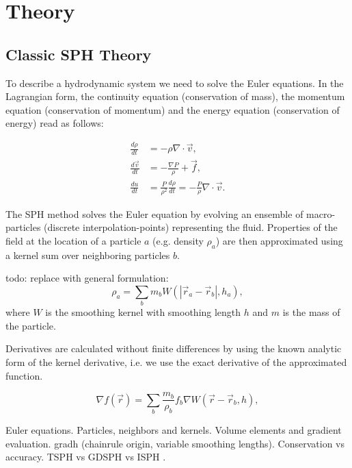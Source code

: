 \section{Theory}

\subsection{Classic SPH Theory}
To describe a hydrodynamic system we need to solve the Euler equations. In the Lagrangian form, the continuity equation (conservation of mass), the momentum equation (conservation of momentum) and the energy equation (conservation of energy) read as follows: 

\begin{align}
\frac{d\rho}{dt} &= -\rho \nabla \cdot \vec{v}, \\
\frac{d\vec{v}}{dt} &= -\frac{\nabla P}{\rho} + \vec{f}, \\
\frac{du}{dt} &= \frac{P}{\rho^2}\frac{d\rho}{dt} = -\frac{P}{\rho}\nabla \cdot \vec{v}.
\end{align}

The SPH method solves the Euler equation by evolving an ensemble of macro-particles (discrete interpolation-points) representing the fluid. Properties of the field at the location of a particle $a$ (e.g. density $\rho_a$) are then approximated using a kernel sum over neighboring particles $b$.

todo: replace with general formulation:
\begin{equation}
\rho_a = \sum_b m_b W(|\vec{r}_a - \vec{r}_b|, h_a),
\end{equation}
where $W$ is the smoothing kernel with smoothing length $h$ and $m$ is the mass of the particle.   

Derivatives are calculated without finite differences by using the known analytic form of the kernel derivative, i.e. we use the exact derivative of the approximated function. 

\begin{equation}
\nabla f(\vec{r}) = \sum_b \frac{m_b}{\rho_b} f_b \nabla W(\vec{r} - \vec{r}_b, h),
\label{eq:derivatives}
\end{equation}

Euler equations. Particles, neighbors and kernels. Volume elements and gradient evaluation. gradh (chainrule origin, variable smoothing lengths). Conservation vs accuracy. TSPH vs GDSPH vs ISPH .

